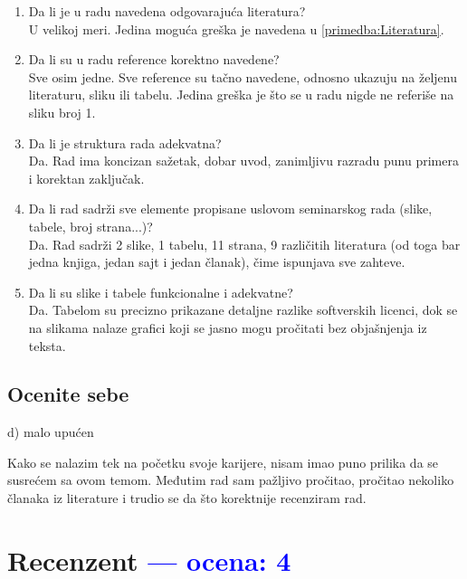 \documentclass[a4paper]{report}
\newcommand{\odgovor}[1]{\textcolor{blue}{#1}}
\begin{document}
\begin{enumerate}
\item Da li je u radu navedena odgovarajuća literatura?\\
    U velikoj meri. Jedina moguća greška je navedena u \ref{primedba:Literatura}.

\item Da li su u radu reference korektno navedene?\\
    Sve osim jedne. Sve reference su tačno navedene, odnosno ukazuju na željenu literaturu, sliku ili tabelu. Jedina greška je što se u radu nigde ne referiše na sliku broj 1.

\item Da li je struktura rada adekvatna?\\
    Da. Rad ima koncizan sažetak, dobar uvod, zanimljivu razradu punu primera i korektan zaključak.
 
\item Da li rad sadrži sve elemente propisane uslovom seminarskog rada (slike, tabele, broj strana...)?\\
    Da. Rad sadrži 2 slike, 1 tabelu, 11 strana, 9 različitih literatura (od toga bar jedna knjiga, jedan sajt i jedan članak), čime ispunjava sve zahteve.

\item Da li su slike i tabele funkcionalne i adekvatne?\\
    Da. Tabelom su precizno prikazane detaljne razlike softverskih licenci, dok se na slikama nalaze grafici koji se jasno mogu pročitati bez objašnjenja iz teksta.

\end{enumerate}

\section{Ocenite sebe}
d) malo upućen

Kako se nalazim tek na početku svoje karijere, nisam imao puno prilika da se susrećem sa ovom temom. Međutim rad sam pažljivo pročitao, pročitao nekoliko članaka iz literature i trudio se da što korektnije recenziram rad.

\chapter{Recenzent \odgovor{--- ocena: 4} }
\end{document}

